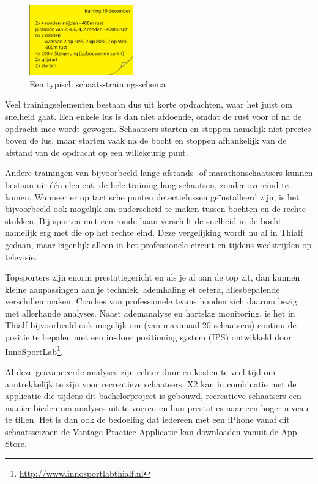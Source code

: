 \begin{figure}[H]
  \begin{center}
    \includegraphics[width=0.4\textwidth]{style/images/training}
  \end{center}
  \caption{Een typisch schaats-trainingsschema}
  \label{fig:training}
\end{figure}

Veel trainingselementen bestaan dus uit korte opdrachten, waar het juist om snelheid gaat. Een enkele lus is dan niet afdoende, omdat de rust voor of na de opdracht mee wordt gewogen. Schaatsers starten en stoppen namelijk niet precies boven de lus, maar starten vaak na de bocht en stoppen afhankelijk van de afstand van de opdracht op een willekeurig punt. 

Andere trainingen van bijvoorbeeld lange afstands- of marathonschaatsers kunnen bestaan uit één element: de hele training lang schaatsen, zonder overeind te komen. Wanneer er op tactische punten detectielussen geïnstalleerd zijn, is het bijvoorbeeld ook mogelijk om onderscheid te maken tussen bochten en de rechte stukken. Bij sporten met een ronde baan verschilt de snelheid in de bocht namelijk erg met die op het rechte eind. Deze vergelijking wordt nu al in Thialf gedaan, maar eigenlijk alleen in het professionele circuit en tijdens wedstrijden op televisie.

Topsporters zijn enorm prestatiegericht en als je al aan de top zit, dan kunnen kleine aanpassingen aan je techniek, ademhaling et cetera, allesbepalende verschillen maken. Coaches van professionele teams houden zich daarom bezig met allerhande analyses. Naast ademanalyse en hartslag monitoring, is het in Thialf bijvoorbeeld ook mogelijk om (van maximaal 20 schaatsers) continu de positie te bepalen met een in-door positioning system (IPS) ontwikkeld door InnoSportLab\footnote{\url{http://www.innosportlabthialf.nl}}.

Al deze geavanceerde analyses zijn echter duur en kosten te veel tijd om aantrekkelijk te zijn voor recreatieve schaatsers. \mylaps X2 kan in combinatie met de applicatie die tijdens dit bachelorproject is gebouwd, recreatieve schaatsers een manier bieden om analyses uit te voeren en hun prestaties naar een hoger niveau te tillen. Het is dan ook de bedoeling dat iedereen met een iPhone vanaf dit schaatsseizoen de Vantage Practice Applicatie kan downloaden vanuit de App Store.


